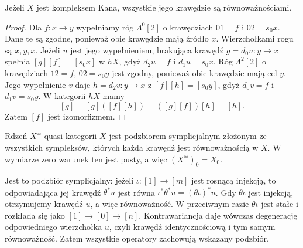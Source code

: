 \begin{lemat}\label{cat:lem:kan-edges-equivalences}
Jeżeli $X$ jest kompleksem Kana, wszystkie jego krawędzie są równoważnościami.
\end{lemat}
\begin{proof}
Dla $f:x\to y$ wypełniamy róg $\Lambda^0[2]$ o krawędziach $01=f$ i $02=s_0x$. Dane te są zgodne, ponieważ obie krawędzie mają źródło $x$. Wierzchołkami rogu są $x,y,x$. Jeżeli $u$ jest jego wypełnieniem, brakująca krawędź $g=d_0u:y\to x$ spełnia $[g][f]=[s_0x]$ w $hX$, gdyż $d_2u=f$ i $d_1u=s_0x$. Róg $\Lambda^2[2]$ o krawędziach $12=f$, $02=s_0y$ jest zgodny, ponieważ obie krawędzie mają cel $y$. Jego wypełnienie $v$ daje $h=d_2v:y\to x$ z $[f][h]=[s_0y]$, gdyż $d_0v=f$ i $d_1v=s_0y$. W kategorii $hX$ mamy
\[
 [g]=[g]([f][h])=([g][f])[h]=[h].
\]
Zatem $[f]$ jest izomorfizmem.
\end{proof}

\begin{definicja}[Rdzeń]\label{cat:def:quasicat-core}
Rdzeń $X^\simeq$ quasi-kategorii $X$ jest podzbiorem symplicjalnym złożonym ze wszystkich sympleksów, których każda krawędź jest równoważnością w $X$. W wymiarze zero warunek ten jest pusty, a więc $(X^\simeq)_0=X_0$.
\end{definicja}
Jest to podzbiór symplicjalny: jeżeli $\iota:[1]\to[m]$ jest rosnącą injekcją, to odpowiadająca jej krawędź $\theta^*u$ jest równa $\iota^*\theta^*u=(\theta\iota)^*u$. Gdy $\theta\iota$ jest injekcją, otrzymujemy krawędź $u$, a więc równoważność. W przeciwnym razie $\theta\iota$ jest stałe i rozkłada się jako $[1]\to[0]\to[n]$. Kontrawariancja daje wówczas degenerację odpowiedniego wierzchołka $u$, czyli krawędź identycznościową i tym samym równoważność. Zatem wszystkie operatory zachowują wskazany podzbiór.

